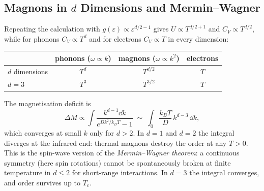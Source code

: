 \subsection{Magnons in $d$ Dimensions and Mermin--Wagner}

Repeating the calculation with $g(\varepsilon)\propto\varepsilon^{d/2-1}$ gives $U\propto T^{d/2+1}$ and $C_V\propto T^{d/2}$, while for phonons $C_V\propto T^d$ and for electrons $C_V\propto T$ in every dimension:

\begin{center}
\begin{tabular}{lccc}
\toprule
 & phonons ($\omega\propto k$) & magnons ($\omega\propto k^2$) & electrons \\
\midrule
$d$ dimensions & $T^{d}$ & $T^{d/2}$ & $T$ \\
$d=3$ & $T^3$ & $T^{3/2}$ & $T$ \\
\bottomrule
\end{tabular}
\end{center}

The magnetisation deficit is
\begin{equation}
    \Delta M\propto\int\frac{k^{d-1}\dd k}{e^{Dk^2/k_BT}-1}\;\sim\;\int_0\frac{k_BT}{D}\,k^{d-3}\,\dd k,
\end{equation}
which converges at small $k$ only for $d>2$. In $d=1$ and $d=2$ the integral diverges at the infrared end: thermal magnons destroy the order at any $T>0$. This is the spin-wave version of the \emph{Mermin--Wagner theorem}: a continuous symmetry (here spin rotations) cannot be spontaneously broken at finite temperature in $d\le2$ for short-range interactions. In $d=3$ the integral converges, and order survives up to $T_c$.
